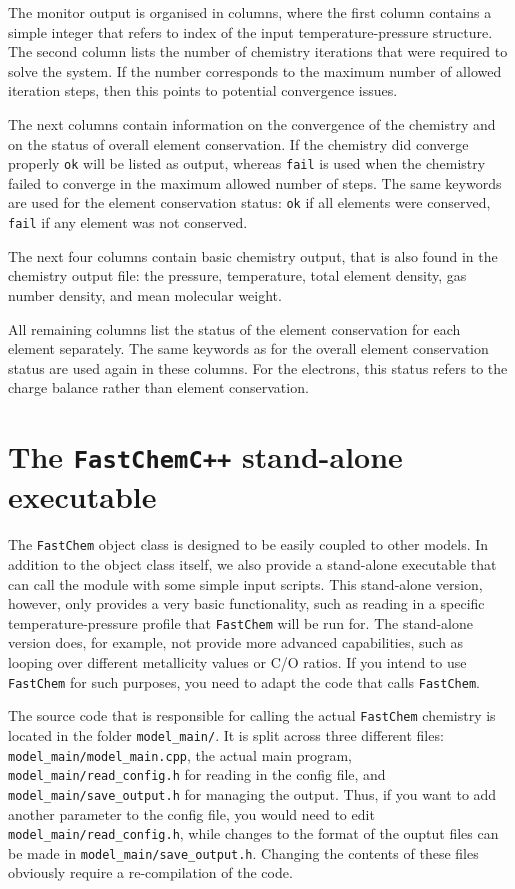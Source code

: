 \documentclass[numbers=noenddot]{aux/fcmanual}
\newcommand{\fc}{\texttt{FastChem}\xspace}
\newcommand{\cpp}{\ttt{C++}\xspace}
\newcommand{\ttt}[1]{\texttt {#1}}
\begin{document}
The monitor output is organised in columns, where the first column contains a simple integer that refers to index of the input temperature-pressure structure. The second column lists the number of chemistry iterations that were required to solve the system. If the number corresponds to the maximum number of allowed iteration steps, then this points to potential convergence issues. 

The next columns contain information on the convergence of the chemistry and on the status of overall element conservation. If the chemistry did converge properly \verb|ok| will be listed as output, whereas \verb|fail| is used when the chemistry failed to converge in the maximum allowed number of steps. The same keywords are used for the element conservation status: \verb|ok| if all elements were conserved, \verb|fail| if any element was not conserved. 

The next four columns contain basic chemistry output, that is also found in the chemistry output file: the pressure, temperature, total element density, gas number density, and mean molecular weight.

All remaining columns list the status of the element conservation for each element separately. The same keywords as for the overall element conservation status are used again in these columns. For the electrons, this status refers to the charge balance rather than element conservation.




\chapter{The \fc \cpp stand-alone executable}

The \fc object class is designed to be easily coupled to other models. In addition to the object class itself, we also provide a stand-alone executable that can call the module with some simple input scripts. This stand-alone version, however, only provides a very basic functionality, such as reading in a specific temperature-pressure profile that \fc will be run for. The stand-alone version does, for example, not provide more advanced capabilities, such as looping over different metallicity values or C/O ratios. If you intend to use \fc for such purposes, you need to adapt the code that calls \fc.

The source code that is responsible for calling the actual \fc chemistry is located in the folder \verb|model_main/|. It is split across three different files: \verb|model_main/model_main.cpp|, the actual main program, \verb|model_main/read_config.h| for reading in the config file, and \verb|model_main/save_output.h| for managing the output. Thus, if you want to add another parameter to the config file, you would need to edit \verb|model_main/read_config.h|, while changes to the format of the ouptut files can be made in \verb|model_main/save_output.h|. Changing the contents of these files obviously require a re-compilation of the code.
\end{document}
